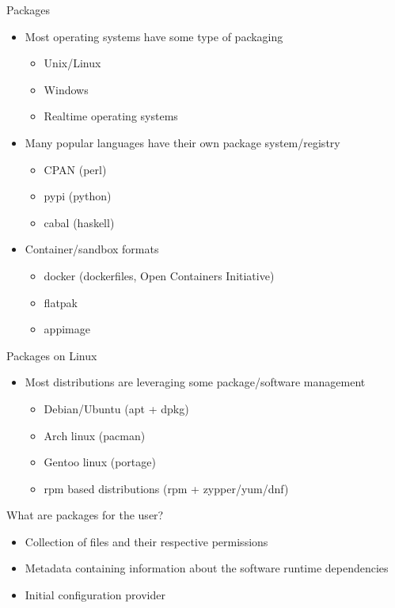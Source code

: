 \documentclass{beamer}
\begin{document}
\begin{frame}[t]{Packages}
	\begin{itemize}
	\item Most operating systems have some type of packaging
    \begin{itemize}
      \item Unix/Linux
      \item Windows
      \item Realtime operating systems
    \end{itemize}
  \item Many popular languages have their own package system/registry
    \begin{itemize}
      \item CPAN (perl)
      \item pypi (python)
      \item cabal (haskell)
    \end{itemize}
    \item Container/sandbox formats
      \begin{itemize}
        \item docker (dockerfiles, Open Containers Initiative)
        \item flatpak
        \item appimage
      \end{itemize}
	\end{itemize}
\end{frame}

\begin{frame}[t]{Packages on Linux}
	\begin{itemize}
	\item Most distributions are leveraging some package/software management
    \begin{itemize}
      \item Debian/Ubuntu (apt + dpkg)
      \item Arch linux (pacman)
      \item Gentoo linux (portage)
      \item rpm based distributions (rpm + zypper/yum/dnf)
    \end{itemize}
  \end{itemize}
\end{frame}


\begin{frame}[t]{What are packages for the user?}
	\begin{itemize}
	\item Collection of files and their respective permissions
	\item Metadata containing information about the software runtime dependencies
	\item Initial configuration provider
	\end{itemize}
\end{frame}
\end{document}
